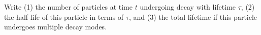 

\vspace*{\fill}
\centering

Write (1) the number of particles at time $t$ undergoing decay with lifetime $\tau$, (2) the half-life of this particle in terms of $\tau$, and (3) the total lifetime if this particle undergoes multiple decay modes.

\centering
\vspace*{\fill}

